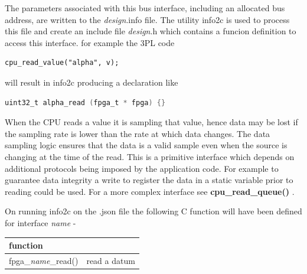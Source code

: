             The parameters associated with this bus interface, including an
            allocated bus address, are written
            to the {\em design}.info file.
            The utility info2c is used to process this file and create
            an include file {\em design}.h which contains a funcion
            definition to access this interface. for example the 3PL
            code
            \begin{lstlisting}[gobble=12, language=threepl]
               cpu_read_value("alpha", v);
            \end{lstlisting}
            will result in info2c producing a declaration like
            \begin{lstlisting}[gobble=12, language=C]
               uint32_t alpha_read (fpga_t * fpga) {}
            \end{lstlisting}
            
            When the CPU reads a value it is sampling that value, hence data may
            be lost if the sampling rate is lower than the rate at which data
            changes. The data sampling logic ensures that the data is a valid
            sample even when the source is changing at the time of the
            read. This is a primitive interface which depends on additional
            protocols being imposed by the application code. For example to
            guarantee data integrity a write to register the data in a static
            variable prior to reading could be used. For a more complex interface see {\bf cpu\_read\_queue()}
            .
            
            On running info2c on the .json file the following C function will have been
            defined for interface {\em name} -
            
            \begin{tabular}{| l | l |}
            \hline
            function                   &                 \\ \hline \hline
            fpga\_{\em name}\_read()   & read a datum    \\ \hline
            \end{tabular}
            
